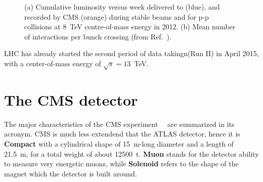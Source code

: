 \begin{figure}[hbt]
  \begin{center}
    \caption{(a) Cumulative luminosity versus week delivered to (blue), and recorded by CMS (orange) 
             during stable beams and for p-p collisions at 8~TeV centre-of-mass energy in 2012.
             (b) Mean number of interactions per bunch crossing (from Ref.~\cite{LumiPublic}).} 
    \label{fig:LHClumiPU}
  \end{center}
\end{figure}

LHC has already started the second period of data takingn(Run II) in April 2015, 
with a center-of-mass energy of $\sqrt{s}=13$~TeV.

\section{The CMS detector}
\label{sec:CMS}

The major characteristics of the CMS experiment~\cite{Chatrchyan:2008aa}~\cite{Bayatian:2006zz}
are summarized in its acronym. CMS is much less extendend that the ATLAS detector, 
hence it is \textbf{Compact} with a cylindrical shape of 15~\si{m}-long diameter and a length of 21.5~\si{m},
for a total weight of about 12500~\si{t}. \textbf{Muon} stands for the detector 
ability to measure very energetic muons, while \textbf{Solenoid} refers
to the shape of the magnet which the detector is built around.


